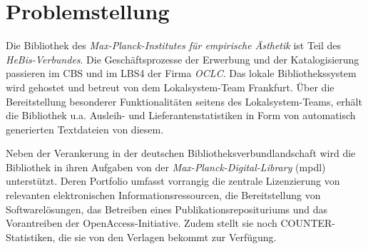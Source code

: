 \documentclass[10pt,a4paper,twocolumn,conference]{IEEEtran}
\begin{document}



\section{Problemstellung}
Die Bibliothek des \textit{Max-Planck-Institutes für empirische Ästhetik}
ist Teil des \textit{HeBis-Verbundes}. Die Geschäftsprozesse der Erwerbung und
der Katalogisierung passieren im CBS und im LBS4 der Firma \textit{OCLC}. Das  
lokale Bibliothekssystem wird gehostet und betreut von dem Lokalsystem-Team Frankfurt.
Über die Bereitstellung besonderer Funktionalitäten seitens des
Lokalsystem-Teams, erhält die Bibliothek u.a. Ausleih- und Lieferantenstatistiken in
Form von automatisch generierten Textdateien von diesem. 


Neben der Verankerung in der deutschen Bibliotheksverbundlandschaft
wird die Bibliothek in ihren Aufgaben von der
\textit{Max-Planck-Digital-Library} (mpdl)
unterstützt. Deren Portfolio umfasst vorrangig die zentrale Lizenzierung
von relevanten elektronischen Informationsressourcen, die Bereitstellung
von Softwarelösungen, das Betreiben eines Publikationsreposituriums und 
das Vorantreiben der OpenAccess-Initiative. Zudem stellt sie noch
COUNTER-Statistiken, die sie von den Verlagen bekommt zur Verfügung.
\end{document}
